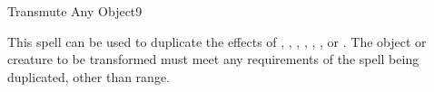 \begin{spellsection}{Transmute Any Object}{9}
    \begin{spellheader}
    \end{spellheader}
    \begin{spellcontent}
        \begin{spelltargetinginfo}
            \spellrng{\rngmed}
        \end{spelltargetinginfo}
        \begin{spelleffects}
            \spellspecial This spell can be used to duplicate the effects of , , , , , , or . The object or creature to be transformed must meet any requirements of the spell being duplicated, other than range.
        \end{spelleffects}
    \end{spellcontent}
    \begin{spellfooter}
        \miscastexplode
    \end{spellfooter}
\end{spellsection}

